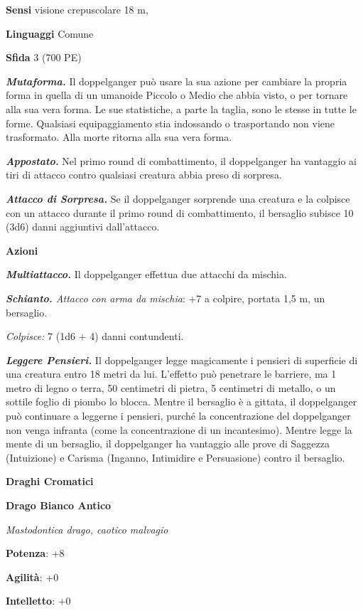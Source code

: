 \begin{multicols}{2}
\textbf{Sensi} visione crepuscolare 18 m, 

\textbf{Linguaggi} Comune

\textbf{Sfida} 3 (700 PE)

\emph{\textbf{Mutaforma.}} Il doppelganger può usare la sua azione per
cambiare la propria forma in quella di un umanoide Piccolo o Medio che
abbia visto, o per tornare alla sua vera forma. Le sue statistiche, a
parte la taglia, sono le stesse in tutte le forme. Qualsiasi
equipaggiamento stia indossando o trasportando non viene trasformato.
Alla morte ritorna alla sua vera forma.

\emph{\textbf{Appostato.}} Nel primo round di combattimento, il
doppelganger ha vantaggio ai tiri di attacco contro qualsiasi creatura
abbia preso di sorpresa.

\emph{\textbf{Attacco di Sorpresa.}} Se il doppelganger sorprende una
creatura e la colpisce con un attacco durante il primo round di
combattimento, il bersaglio subisce 10 (3d6) danni aggiuntivi
dall'attacco.

\textbf{Azioni}

\emph{\textbf{Multiattacco.}} Il doppelganger effettua due attacchi da
mischia.

\emph{\textbf{Schianto.} Attacco con arma da mischia}: +7 a colpire,
portata 1,5 m, un bersaglio.

\emph{Colpisce:} 7 (1d6 + 4) danni contundenti.

\emph{\textbf{Leggere Pensieri.}} Il doppelganger legge magicamente i
pensieri di superficie di una creatura entro 18 metri da lui. L'effetto
può penetrare le barriere, ma 1 metro di legno o terra, 50 centimetri di
pietra, 5 centimetri di metallo, o un sottile foglio di piombo lo
blocca. Mentre il bersaglio è a gittata, il doppelganger può continuare
a leggerne i pensieri, purché la concentrazione del doppelganger non
venga infranta (come la concentrazione di un incantesimo). Mentre legge
la mente di un bersaglio, il doppelganger ha vantaggio alle prove di
Saggezza (Intuizione) e Carisma (Inganno, Intimidire e Persuasione)
contro il bersaglio.

\textbf{Draghi Cromatici}

\textbf{Drago Bianco Antico}

\emph{Mastodontica drago, caotico malvagio}

\textbf{Potenza}: +8

\textbf{Agilità}: +0

\textbf{Intelletto}: +0


\end{multicols}
